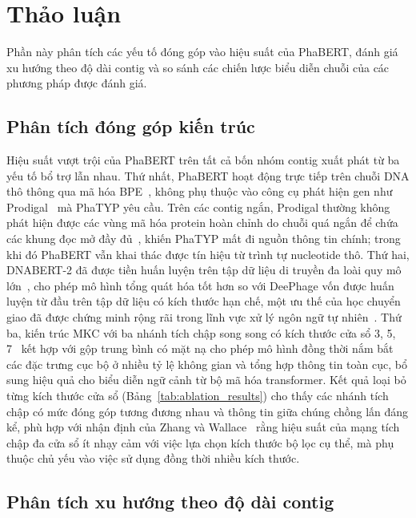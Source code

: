 \section{Thảo luận}
\label{sec:thao_luan}

Phần này phân tích các yếu tố đóng góp vào hiệu suất của PhaBERT, đánh giá xu hướng theo độ dài contig và so sánh các chiến lược biểu diễn chuỗi của các phương pháp được đánh giá.

\subsection{Phân tích đóng góp kiến trúc}
\label{sec:kien_truc_contribution}

Hiệu suất vượt trội của PhaBERT trên tất cả bốn nhóm contig xuất phát từ ba yếu tố bổ trợ lẫn nhau. Thứ nhất, PhaBERT hoạt động trực tiếp trên chuỗi DNA thô thông qua mã hóa BPE~\cite{sennrich2015neural}, không phụ thuộc vào công cụ phát hiện gen như Prodigal~\cite{hyatt2010prodigal} mà PhaTYP yêu cầu. Trên các contig ngắn, Prodigal thường không phát hiện được các vùng mã hóa protein hoàn chỉnh do chuỗi quá ngắn để chứa các khung đọc mở đầy đủ~\cite{trimble2012short}, khiến PhaTYP mất đi nguồn thông tin chính; trong khi đó PhaBERT vẫn khai thác được tín hiệu từ trình tự nucleotide thô. Thứ hai, DNABERT-2 đã được tiền huấn luyện trên tập dữ liệu di truyền đa loài quy mô lớn~\cite{zhou2023dnabert}, cho phép mô hình tổng quát hóa tốt hơn so với DeePhage vốn được huấn luyện từ đầu trên tập dữ liệu có kích thước hạn chế, một ưu thế của học chuyển giao đã được chứng minh rộng rãi trong lĩnh vực xử lý ngôn ngữ tự nhiên~\cite{howard2018universal,devlin2019bert}. Thứ ba, kiến trúc MKC với ba nhánh tích chập song song có kích thước cửa sổ 3, 5, 7~\cite{kim2014convolutional} kết hợp với gộp trung bình có mặt nạ cho phép mô hình đồng thời nắm bắt các đặc trưng cục bộ ở nhiều tỷ lệ không gian và tổng hợp thông tin toàn cục, bổ sung hiệu quả cho biểu diễn ngữ cảnh từ bộ mã hóa transformer. Kết quả loại bỏ từng kích thước cửa sổ (Bảng~\ref{tab:ablation_results}) cho thấy các nhánh tích chập có mức đóng góp tương đương nhau và thông tin giữa chúng chồng lấn đáng kể, phù hợp với nhận định của Zhang và Wallace~\cite{zhang2017sensitivity} rằng hiệu suất của mạng tích chập đa cửa sổ ít nhạy cảm với việc lựa chọn kích thước bộ lọc cụ thể, mà phụ thuộc chủ yếu vào việc sử dụng đồng thời nhiều kích thước.

\subsection{Phân tích xu hướng theo độ dài contig}
\label{sec:xu_huong_do_dai}

